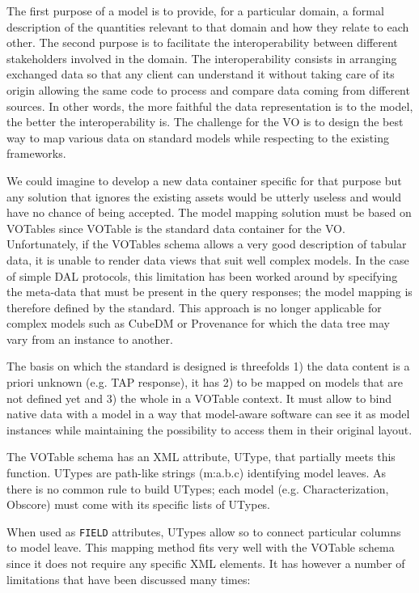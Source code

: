 
The first purpose of a model is to provide, for a particular domain, a formal description of the quantities relevant to that domain and how they relate to each other.
The second purpose is to facilitate the interoperability between  different stakeholders involved in the domain. The interoperability consists in arranging exchanged data 
so that any client can understand it without taking care of its origin allowing the same code to process and compare data coming from different sources.  
In other words, the more faithful the data representation is to the model, the better the interoperability is.
The challenge for the VO is to design the best way to map various data on standard models while respecting to the existing frameworks.

We could imagine to develop a new data container specific for that purpose but any solution that ignores the existing assets would be utterly useless and would have no chance of being accepted.
The model mapping solution must be based on VOTables since VOTable  \citep{2019ivoa.spec.1021O} is the standard data container for the VO.
Unfortunately, if the VOTables schema allows a very good description of tabular data, it is unable to render data views that suit well complex models.
In the case of simple DAL protocols, this limitation has been worked around by specifying the meta-data that must be present in the query responses; the model mapping is therefore defined by the standard.
This approach is no longer applicable for complex models such as CubeDM or Provenance for which the data tree may vary from an instance to another.

The basis on which the standard is designed is threefolds 1) the data content is a priori unknown (e.g. TAP response), it has 2) to be mapped on models that are not defined yet and 3) the whole in a VOTable context.
It must allow to bind native data with a model in a way that model-aware software can see it as 
model instances while maintaining the possibility to access them in their original layout.

The VOTable schema has an XML attribute, UType, that partially meets this function. 
UTypes are path-like strings (m:a.b.c) identifying model leaves. As there is no common rule to build UTypes; each model (e.g. Characterization, Obscore)  must come with its specific lists of UTypes. 

When used as \texttt{FIELD} attributes, UTypes allow so to connect particular columns to model leave. This mapping method fits very well with the VOTable schema since it does not require any specific XML elements. It has however a number of limitations that have been discussed many times:

